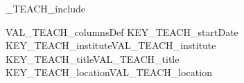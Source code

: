 %
\ifVAL_TEACH_include %
\begin{myTableEnv}{VAL_TEACH_columnsDef}%
    \myRow%
        {KEY_TEACH_startDate}{}%
        {KEY_TEACH_institute}{VAL_TEACH_institute}%
    \myRow%
        {KEY_TEACH_title}{VAL_TEACH_title}%
        {KEY_TEACH_location}{VAL_TEACH_location}%
\end{myTableEnv}%
%
\fi%
%